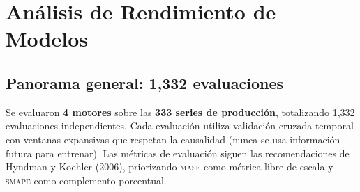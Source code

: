 \documentclass[12pt, letterpaper]{article}
\newcommand{\smape}{\textnormal{\textsc{smape}}}
\newcommand{\mase}{\textnormal{\textsc{mase}}}
\begin{document}
\section{Análisis de Rendimiento de Modelos}\label{sec:rendimiento}

\subsection{Panorama general: 1,332 evaluaciones}

Se evaluaron \textbf{4 motores} sobre las \textbf{333 series de producción}, totalizando 1,332 evaluaciones independientes. Cada evaluación utiliza validación cruzada temporal con ventanas expansivas que respetan la causalidad (nunca se usa información futura para entrenar). Las métricas de evaluación siguen las recomendaciones de Hyndman y Koehler (2006), priorizando \mase{} como métrica libre de escala y \smape{} como complemento porcentual.
\end{document}
